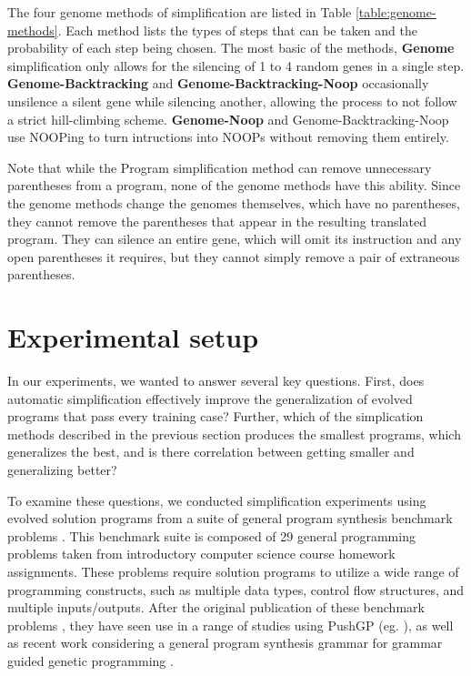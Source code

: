 The four genome methods of simplification are listed in Table \ref{table:genome-methods}. Each method lists the types of steps that can be taken and the probability of each step being chosen. The most basic of the methods, 
\textbf{Genome} simplification only allows for the silencing 
of 1 to 4 random genes in a single step. \textbf{Genome-Backtracking} and \textbf{Genome-Backtracking-Noop} occasionally unsilence a silent gene while silencing another, allowing the process to not follow a strict hill-climbing scheme.  \textbf{Genome-Noop} and Genome-Backtracking-Noop use NOOPing to turn intructions into NOOPs without removing them entirely.

Note that while the Program simplification method can remove unnecessary parentheses from a program, none of the genome methods have this ability. Since the genome methods change the genomes themselves, which have no parentheses, they cannot remove the parentheses that appear in the resulting translated program. They can silence an entire gene, which will omit its instruction and any open parentheses it requires, but they cannot simply remove a pair of extraneous parentheses.

\section{Experimental setup}
\label{sec:setup}

In our experiments, we wanted to answer several key questions. 
First, does automatic simplification effectively improve the generalization of evolved programs that pass every training case? 
Further, which of the simplication methods described in the previous section 
produces the smallest programs, which generalizes the best, and is there correlation between getting smaller and generalizing better?

To examine these questions, we conducted simplification experiments using evolved solution programs from a suite of general program synthesis benchmark problems \cite{Helmuth:2015:GECCO}. This benchmark suite is composed of 29 general programming problems taken from introductory computer science course homework assignments. These problems require solution programs to utilize a wide range of programming constructs, such as multiple data types, control flow structures, and multiple inputs/outputs.
After the original publication of these benchmark problems \cite{Helmuth:2015:GECCO}, they have seen use in a range of studies using PushGP (eg. \cite{Helmuth:2016:GECCO, McPhee:2016:GPTP, Helmuth:2015:GPTP, Helmuth:2015:dissertation}),  %
as well as recent work considering a general program synthesis grammar for 
grammar guided genetic programming \cite{Forstenlechner:2017:eurogp}.

